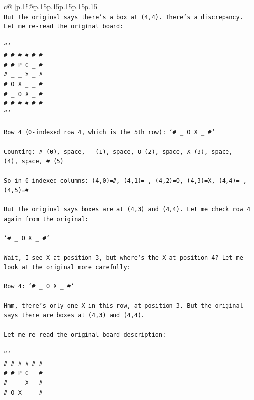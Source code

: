 \documentclass{article}
\begin{document}
{\begin{supertabular}{c@{$\;$}|p{.15\linewidth}@{}p{.15\linewidth}p{.15\linewidth}p{.15\linewidth}p{.15\linewidth}p{.15\linewidth}}
{{{\\ 
\texttt{But the original says there's a box at (4,4). There's a discrepancy. Let me re{-}read the original board:} \\
\\ 
\texttt{```} \\
\texttt{\# \# \# \# \# \#} \\
\texttt{\# \# P O \_ \#} \\
\texttt{\# \_ \_ X \_ \#} \\
\texttt{\# O X \_ \_ \#} \\
\texttt{\# \_ O X \_ \#} \\
\texttt{\# \# \# \# \# \#} \\
\texttt{```} \\
\\ 
\texttt{Row 4 (0{-}indexed row 4, which is the 5th row): `\# \_ O X \_ \#`} \\
\\ 
\texttt{Counting: \# (0), space, \_ (1), space, O (2), space, X (3), space, \_ (4), space, \# (5)} \\
\\ 
\texttt{So in 0{-}indexed columns: (4,0)=\#, (4,1)=\_, (4,2)=O, (4,3)=X, (4,4)=\_, (4,5)=\#} \\
\\ 
\texttt{But the original says boxes are at (4,3) and (4,4). Let me check row 4 again from the original:} \\
\\ 
\texttt{`\# \_ O X \_ \#`} \\
\\ 
\texttt{Wait, I see X at position 3, but where's the X at position 4? Let me look at the original more carefully:} \\
\\ 
\texttt{Row 4: `\# \_ O X \_ \#`} \\
\\ 
\texttt{Hmm, there's only one X in this row, at position 3. But the original says there are boxes at (4,3) and (4,4). } \\
\\ 
\texttt{Let me re{-}read the original board description:} \\
\\ 
\texttt{```} \\
\texttt{\# \# \# \# \# \#} \\
\texttt{\# \# P O \_ \#} \\
\texttt{\# \_ \_ X \_ \#} \\
\texttt{\# O X \_ \_ \#} \\
}}}
\end{supertabular}}
\end{document}
